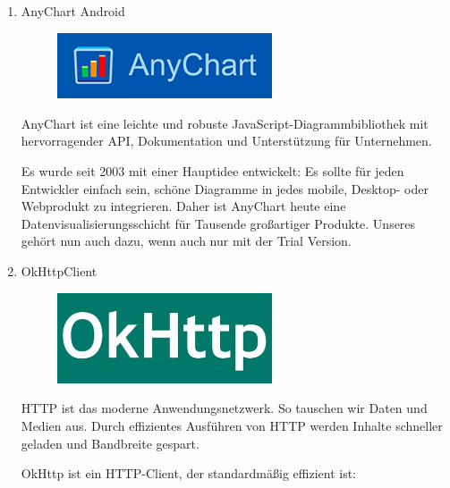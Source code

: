 \documentclass[10pt]{scrartcl}
\begin{document}
\begin{enumerate}
	
	\item 
	AnyChart Android

\begin{figure}[H]
	\centering
	\includegraphics[width=0.6\textwidth]{Bilder/BibliothekenLogos/Anychart.png}
\end{figure}


AnyChart ist eine leichte und robuste JavaScript-Diagrammbibliothek mit hervorragender API, Dokumentation und Unterstützung für Unternehmen.

Es wurde seit 2003 mit einer Hauptidee entwickelt: Es sollte für jeden Entwickler einfach sein, schöne Diagramme in jedes mobile, Desktop- oder Webprodukt zu integrieren. Daher ist AnyChart heute eine Datenvisualisierungsschicht für Tausende großartiger Produkte. Unseres gehört nun auch dazu, wenn auch nur mit der Trial Version.


	\item 
	OkHttpClient

\begin{figure}[H]
	\centering
	\includegraphics[width=0.6\textwidth]{Bilder/BibliothekenLogos/OKHTTP.jpg}
\end{figure}


HTTP ist das moderne Anwendungsnetzwerk. So tauschen wir Daten und Medien aus. Durch effizientes Ausführen von HTTP werden Inhalte schneller geladen und Bandbreite gespart.

OkHttp ist ein HTTP-Client, der standardmäßig effizient ist:


\end{enumerate}
\end{document}
